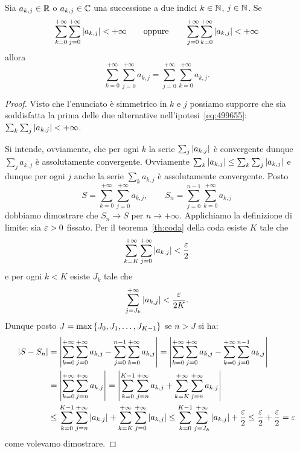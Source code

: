 \begin{theorem}
\label{th:scambio_somma}
Sia $a_{k,j}\in {\mathbb R}$ o $a_{k,j}\in {\mathbb C}$ una successione a due indici $k\in {\mathbb N}$, $j\in {\mathbb N}$.
Se 
\begin{equation}\label{eq:499655}
  \sum_{k=0}^{+\infty}\sum_{j=0}^{+\infty}{\left|a_{k,j}\right|}<+\infty  
  \qquad \text{oppure} \qquad
  \sum_{j=0}^{+\infty}\sum_{k=0}^{+\infty}{\left|a_{k,j}\right|}<+\infty  
\end{equation}
allora
\begin{equation}\label{eq:scambio_somma}
  \sum_{k=0}^{+\infty} \sum_{j=0}^{+\infty} a_{k,j}
  = \sum_{j=0}^{+\infty} \sum_{k=0}^{+\infty} a_{k,j}.
\end{equation}
\end{theorem}
%
\begin{proof}
Visto che l'enunciato è simmetrico in $k$ e $j$ 
possiamo supporre che sia soddisfatta la prima 
delle due alternative nell'ipotesi~\eqref{eq:499655}:
$\sum_k \sum_j {\left|a_{k,j}\right|}<+\infty$.

Si intende, ovviamente, che per ogni $k$ 
la serie $\sum_j {\left|a_{k,j}\right|}$ è convergente
dunque $\sum_j a_{k,j}$ è assolutamente convergente.
Ovviamente 
$\sum_k {\left|a_{k,j}\right|} \le \sum_k \sum_j {\left|a_{k,j}\right|}$
e dunque per ogni $j$ anche la serie 
$\sum_k a_{k,j}$ è assolutamente convergente.
Posto
\[
S = \sum_{k=0}^{+\infty}\sum_{j=0}^{+\infty} a_{k,j},
\qquad
S_n = \sum_{j=0}^{n-1}\sum_{k=0}^{+\infty} a_{k,j}  
\]
dobbiamo dimostrare che $S_n \to S$
per $n\to +\infty$. 
Applichiamo la definizione di limite:
sia $\varepsilon>0$ fissato.
Per il teorema~\ref{th:coda} della coda 
esiste $K$ tale che 
\[
  \sum_{k=K}^{+\infty} \sum_{j=0}^{+\infty} {\left|a_{k,j}\right|}<\frac {\varepsilon} 2
\]
e per ogni $k<K$ esiste $J_k$ tale che 
\[
  \sum_{j=J_k}^{+\infty} {\left|a_{k,j}\right|} < \frac{\varepsilon}{2K}.  
\]
Dunque posto $J=\max{\left\{ J_0,J_1, \dots, J_{K-1} \right\}}$
se $n>J$ si ha:
\begin{align*}
  {\left|S-S_n\right|}
  &= {\left|\sum_{k=0}^{+\infty}\sum_{j=0}^{+\infty}a_{k,j} 
  - \sum_{j=0}^{n-1}\sum_{k=0}^{+\infty}a_{k,j}\right|}
  = 
  {\left|\sum_{k=0}^{+\infty}\sum_{j=0}^{+\infty}a_{k,j} 
  - \sum_{k=0}^{+\infty}\sum_{j=0}^{n-1}a_{k,j}\right|}\\
  &=
  {\left|\sum_{k=0}^{+\infty}\sum_{j=n}^{+\infty}a_{k,j} \right|}
  = {\left|\sum_{k=0}^{K-1}\sum_{j=n}^{+\infty} a_{k,j}
   + \sum_{k=K}^{+\infty}\sum_{j=n}^{+\infty} a_{k,j}\right|}\\
   &\le \sum_{k=0}^{K-1}\sum_{j=n}^{+\infty} {\left|a_{k,j}\right|}
    + \sum_{k=K}^{+\infty}\sum_{j=0}^{+\infty} {\left|a_{k,j}\right|}
   \le \sum_{k=0}^{K-1}\sum_{j=J_k}^{+\infty} {\left|a_{k,j}\right|}
   + \frac {\varepsilon} 2
  \le \frac {\varepsilon} 2 + \frac {\varepsilon} 2 = \varepsilon
\end{align*}
come volevamo dimostrare.
\end{proof}

